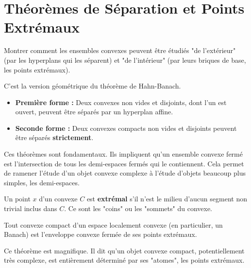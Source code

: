 \section{Théorèmes de Séparation et Points Extrémaux}

\begin{objectif}
    Montrer comment les ensembles convexes peuvent être étudiés "de l'extérieur" (par les hyperplans qui les séparent) et "de l'intérieur" (par leurs briques de base, les points extrémaux).
\end{objectif}

\begin{theorem}
    C'est la version géométrique du théorème de Hahn-Banach.
    \begin{itemize}
        \item \textbf{Première forme :} Deux convexes non vides et disjoints, dont l'un est ouvert, peuvent être séparés par un hyperplan affine.
        \item \textbf{Seconde forme :} Deux convexes compacts non vides et disjoints peuvent être séparés \textbf{strictement}.
    \end{itemize}
\end{theorem}
\begin{remark}
    Ces théorèmes sont fondamentaux. Ils impliquent qu'un ensemble convexe fermé est l'intersection de tous les demi-espaces fermés qui le contiennent. Cela permet de ramener l'étude d'un objet convexe complexe à l'étude d'objets beaucoup plus simples, les demi-espaces.
\end{remark}

\begin{definition}
    Un point $x$ d'un convexe $C$ est \textbf{extrémal} s'il n'est le milieu d'aucun segment non trivial inclus dans $C$. Ce sont les "coins" ou les "sommets" du convexe.
\end{definition}

\begin{theorem}
    Tout convexe compact d'un espace localement convexe (en particulier, un Banach) est l'enveloppe convexe fermée de ses points extrémaux.
\end{theorem}
\begin{remark}
    Ce théorème est magnifique. Il dit qu'un objet convexe compact, potentiellement très complexe, est entièrement déterminé par ses "atomes", les points extrémaux.
\end{remark}

